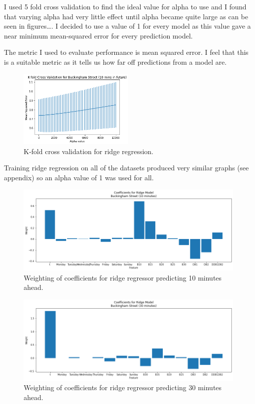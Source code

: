 I used 5 fold cross validation to find the ideal value for alpha to use and I found that varying alpha had very little effect until alpha became quite large 
as can be seen in figures\dots. 
I decided to use a value of 1 for every model as this value gave a near minimum mean-squared error for every prediction model.
\par 
The metric I used to evaluate performance is mean squared error. 
I feel that this is a suitable metric as it tells us how far off predictions from a model are. 
\par
\begin{figure}[H]
    \centering
    \includegraphics[width=0.5\textwidth]{images/ridge_kfold1.png}
    \caption{K-fold cross validation for ridge regression.}
    \end{figure}
\par 

Training ridge regression on all of the datasets produced very similar graphs (see appendix) so an alpha value of 1 was used for all.

\begin{figure}[H]
    \centering
    \includegraphics[width=1\textwidth]{images/coefficients1.png}
    \caption{Weighting of coefficients for ridge regressor predicting 10 minutes ahead.}
    \end{figure}
\par 
\begin{figure}[H]
    \centering
    \includegraphics[width=1\textwidth]{images/coefficients3.png}
    \caption{Weighting of coefficients for ridge regressor predicting 30 minutes ahead.}
    \end{figure}
\par 


